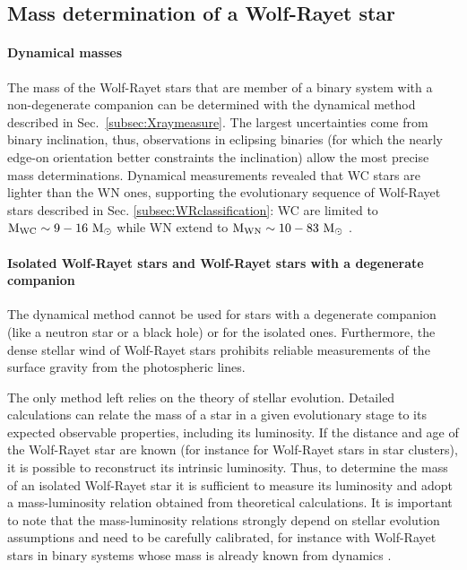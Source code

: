 \documentclass[a4paper,titlepage]{book}     	%
\newcommand{\sun}{\ensuremath{_\odot}}
\newcommand{\msun}{\ensuremath{M\sun}}
\begin{document}
\subsection{Mass determination of a Wolf-Rayet star}\label{subsec:massWR}
\paragraph{Dynamical masses} The mass of the Wolf-Rayet stars that are member of a binary system with a non-degenerate companion can be determined with the dynamical method described in Sec.\ \ref{subsec:Xraymeasure}. The largest uncertainties come from binary inclination, thus, observations in eclipsing binaries (for which the nearly edge-on orientation better constraints the inclination) allow the most precise mass determinations. Dynamical measurements revealed that WC stars are lighter than the WN ones, supporting the evolutionary sequence of Wolf-Rayet stars described in Sec. \ref{subsec:WRclassification}: WC are limited to $\rm M_{\rm WC}\sim 9-16~\msun$ while WN extend to $\rm M_{\rm WN}\sim 10-83~\msun$ \cite{WR_signature}.

\paragraph{Isolated Wolf-Rayet stars and Wolf-Rayet stars with a degenerate companion} The dynamical method cannot be used for stars with a degenerate companion (like a neutron star or a black hole) or for the isolated ones. Furthermore, the dense stellar wind of Wolf-Rayet stars prohibits reliable measurements of the surface gravity from the photospheric lines. 

The only method left relies on the theory of stellar evolution.  Detailed calculations can relate the mass of a star in a given evolutionary stage to its expected observable properties, including its luminosity. If the distance and age of the Wolf-Rayet star are known (for instance for  Wolf-Rayet stars in star clusters), it is possible to reconstruct its intrinsic luminosity. Thus, to determine the mass of an isolated Wolf-Rayet star it is sufficient to measure its luminosity and adopt a mass-luminosity relation obtained from theoretical calculations. It is important to note that the mass-luminosity relations strongly depend on stellar evolution assumptions and need to be carefully calibrated, for instance with Wolf-Rayet stars in binary systems whose mass is already known from dynamics \cite{Nugis2000_WRwinds}.
\end{document}
